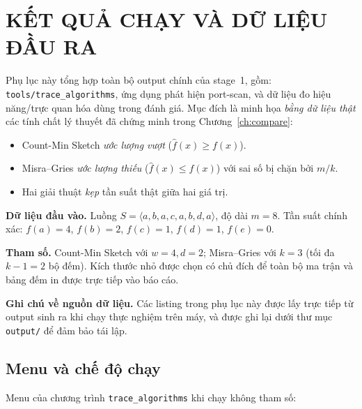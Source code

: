 
\chapter{KẾT QUẢ CHẠY VÀ DỮ LIỆU ĐẦU RA}
\label{app:trace}

Phụ lục này tổng hợp toàn bộ output chính của stage~1, gồm:
\texttt{tools/trace\_algorithms}, ứng dụng phát hiện port-scan, và dữ liệu
đo hiệu năng/trực quan hóa dùng trong đánh giá. Mục đích là minh họa
\emph{bằng dữ liệu thật} các tính chất lý thuyết đã chứng minh trong
Chương~\ref{ch:compare}:
\begin{itemize}
    \item Count-Min Sketch \emph{ước lượng vượt} ($\hat f(x) \ge f(x)$).
    \item Misra--Gries \emph{ước lượng thiếu} ($\hat f(x) \le f(x)$)
          với sai số bị chặn bởi $m/k$.
    \item Hai giải thuật \emph{kẹp} tần suất thật giữa hai giá trị.
\end{itemize}

\noindent\textbf{Dữ liệu đầu vào.} Luồng
$S = \langle a, b, a, c, a, b, d, a \rangle$, độ dài $m = 8$.
Tần suất chính xác: $f(a)=4$, $f(b)=2$, $f(c)=1$, $f(d)=1$, $f(e)=0$.

\noindent\textbf{Tham số.} Count-Min Sketch với
$w=4, d=2$; Misra--Gries với $k=3$ (tối đa $k-1=2$ bộ đếm).
Kích thước nhỏ được chọn có chủ đích để toàn bộ ma trận và bảng đếm
in được trực tiếp vào báo cáo.

\noindent\textbf{Ghi chú về nguồn dữ liệu.} Các listing trong phụ lục này
được lấy trực tiếp từ output sinh ra khi chạy thực nghiệm trên máy, và
được ghi lại dưới thư mục \texttt{output/} để đảm bảo tái lập.

\section{Menu và chế độ chạy}
\label{sec:trace:menu}

Menu của chương trình \texttt{trace\_algorithms} khi chạy không tham số:



